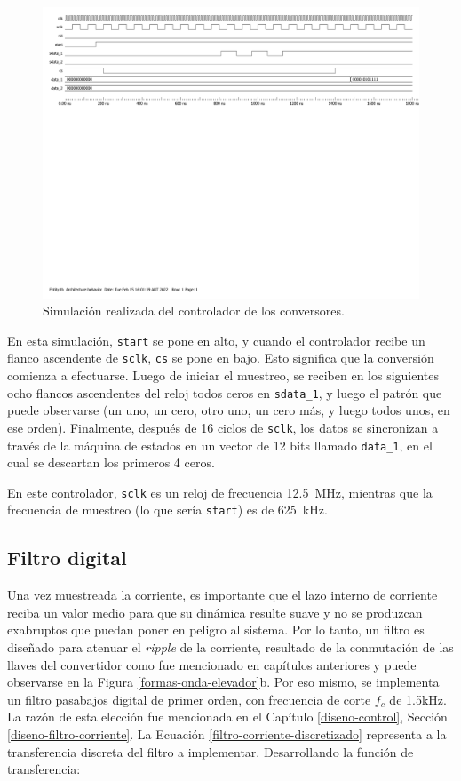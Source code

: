 \begin{figure}[hbt!]
    \centering
    \includegraphics[width=0.85\columnwidth]{Imágenes/Conversor analógico-digital/Test bench.pdf}
    \caption{Simulación realizada del controlador de los conversores.}
    \label{adc-controller}
\end{figure} 

En esta simulación, \texttt{start} se pone en alto, y cuando el controlador recibe un flanco ascendente de \texttt{sclk}, \texttt{cs} se pone en bajo. Esto significa que la conversión comienza a efectuarse. Luego de iniciar el muestreo, se reciben en los siguientes ocho flancos ascendentes del reloj todos ceros en \texttt{sdata\_1}, y luego el patrón que puede observarse (un uno, un cero, otro uno, un cero más, y luego todos unos, en ese orden). Finalmente, después de 16 ciclos de \texttt{sclk}, los datos se sincronizan a través de la máquina de estados en un vector de 12 bits llamado \texttt{data\_1}, en el cual se descartan los primeros 4 ceros.

En este controlador, \texttt{sclk} es un reloj de frecuencia \SI{12.5}{\mega\hertz}, mientras que la frecuencia de muestreo (lo que sería \texttt{start}) es de \SI{625}{\kilo\hertz}. 

\subsection{Filtro digital}

Una vez muestreada la corriente, es importante que el lazo interno de corriente reciba un valor medio para que su dinámica resulte suave y no se produzcan exabruptos que puedan poner en peligro al sistema. Por lo tanto, un filtro es diseñado para atenuar el \emph{ripple} de la corriente, resultado de la conmutación de las llaves del convertidor como fue mencionado en capítulos anteriores y puede observarse en la Figura \ref{formas-onda-elevador}b. Por eso mismo, se implementa un filtro pasabajos digital de primer orden, con frecuencia de corte $f_c$ de 1.5kHz. La razón de esta elección fue mencionada en el Capítulo \ref{diseno-control}, Sección \ref{diseno-filtro-corriente}. La Ecuación \ref{filtro-corriente-discretizado} representa a la transferencia discreta del filtro a implementar. Desarrollando la función de transferencia:

